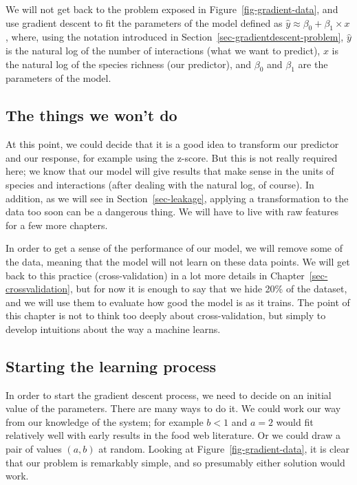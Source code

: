 \documentclass[
  letterpaper,
]{scrbook}
\begin{document}
We will not get back to the problem exposed in
Figure~\ref{fig-gradient-data}, and use gradient descent to fit the
parameters of the model defined as
\(\hat y \approx \beta_0 + \beta_1 \times x\), where, using the notation
introduced in Section~\ref{sec-gradientdescent-problem}, \(\hat y\) is
the natural log of the number of interactions (what we want to predict),
\(x\) is the natural log of the species richness (our predictor), and
\(\beta_0\) and \(\beta_1\) are the parameters of the model.

\subsection{The things we won't do}\label{the-things-we-wont-do}

At this point, we could decide that it is a good idea to transform our
predictor and our response, for example using the z-score. But this is
not really required here; we know that our model will give results that
make sense in the units of species and interactions (after dealing with
the natural log, of course). In addition, as we will see in
Section~\ref{sec-leakage}, applying a transformation to the data too
soon can be a dangerous thing. We will have to live with raw features
for a few more chapters.

In order to get a sense of the performance of our model, we will remove
some of the data, meaning that the model will not learn on these data
points. We will get back to this practice (cross-validation) in a lot
more details in Chapter~\ref{sec-crossvalidation}, but for now it is
enough to say that we hide 20\% of the dataset, and we will use them to
evaluate how good the model is as it trains. The point of this chapter
is not to think too deeply about cross-validation, but simply to develop
intuitions about the way a machine learns.

\subsection{Starting the learning
process}\label{starting-the-learning-process}

In order to start the gradient descent process, we need to decide on an
initial value of the parameters. There are many ways to do it. We could
work our way from our knowledge of the system; for example \(b < 1\) and
\(a = 2\) would fit relatively well with early results in the food web
literature. Or we could draw a pair of values \((a, b)\) at random.
Looking at Figure~\ref{fig-gradient-data}, it is clear that our problem
is remarkably simple, and so presumably either solution would work.
\end{document}
